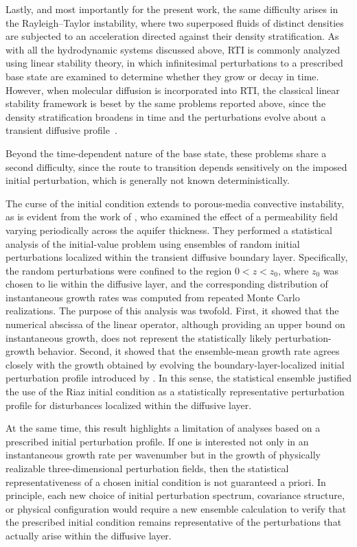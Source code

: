 Lastly, and most importantly for the present work, the same difficulty arises in the Rayleigh--Taylor instability, where two superposed fluids of distinct densities are subjected to an acceleration directed against their density stratification. As with all the hydrodynamic systems discussed above, RTI is commonly analyzed using linear stability theory, in which infinitesimal perturbations to a prescribed base state are examined to determine whether they grow or decay in time. However, when molecular diffusion is incorporated into RTI, the classical linear stability framework is beset by the same problems reported above, since the density stratification broadens in time and the perturbations evolve about a transient diffusive profile~\citep{duff-harlow-hirt-1962,morgan-likhachev-jacobs-2016}.

Beyond the time-dependent nature of the base state, these problems share a second difficulty, since the route to transition depends sensitively on the imposed initial perturbation, which is generally not known deterministically. 

The curse of the initial condition extends to porous-media convective instability, as is evident from the work of \citet{daniel-riaz-tchelepi-2015}, who examined the effect of a permeability field varying periodically across the aquifer thickness. They performed a statistical analysis of the initial-value problem using ensembles of random initial perturbations localized within the transient diffusive boundary layer. Specifically, the random perturbations were confined to the region \(0<z<z_0\), where \(z_0\) was chosen to lie within the diffusive layer, and the corresponding distribution of instantaneous growth rates was computed from repeated Monte Carlo realizations. The purpose of this analysis was twofold. First, it showed that the numerical abscissa of the linear operator, although providing an upper bound on instantaneous growth, does not represent the statistically likely perturbation-growth behavior. Second, it showed that the ensemble-mean growth rate agrees closely with the growth obtained by evolving the boundary-layer-localized initial perturbation profile introduced by \citet{riaz-et-al-2006}. In this sense, the statistical ensemble justified the use of the Riaz initial condition as a statistically representative perturbation profile for disturbances localized within the diffusive layer.

At the same time, this result highlights a limitation of analyses based on a prescribed initial perturbation profile. If one is interested not only in an instantaneous growth rate per wavenumber but in the growth of physically realizable three-dimensional perturbation fields, then the statistical representativeness of a chosen initial condition is not guaranteed a priori. In principle, each new choice of initial perturbation spectrum, covariance structure, or physical configuration would require a new ensemble calculation to verify that the prescribed initial condition remains representative of the perturbations that actually arise within the diffusive layer.


